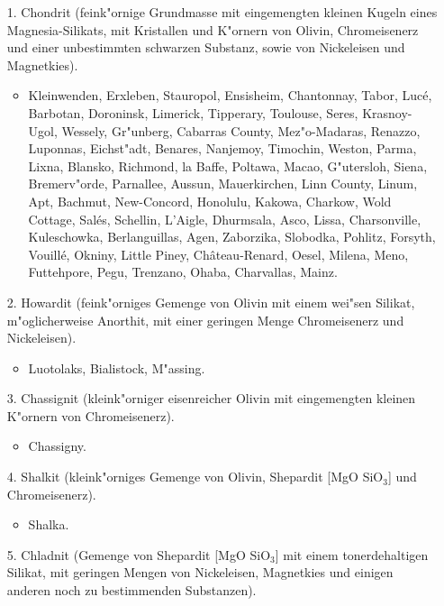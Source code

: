 \documentclass[a4paper, 11pt, oneside]{article}
\begin{document}
\begin{itemize}
    \item[1.] Chondrit (feink"ornige Grundmasse mit eingemengten kleinen Kugeln eines Magnesia-Silikats, mit Kristallen und K"ornern von Olivin, Chromeisenerz und einer unbestimmten schwarzen Substanz, sowie von Nickeleisen und Magnetkies).
    \begin{itemize}
        \item Kleinwenden, Erxleben, Stauropol, Ensisheim, Chantonnay, Tabor, Lucé, Barbotan, Doroninsk, Limerick, Tipperary, Toulouse, Seres, Krasnoy-Ugol, Wessely, Gr"unberg, Cabarras County, Mez"o-Madaras, Renazzo, Luponnas, Eichst"adt, Benares, Nanjemoy, Timochin, Weston, Parma, Lixna, Blansko, Richmond, la Baffe, Poltawa, Macao, G"utersloh, Siena, Bremerv"orde, Parnallee, Aussun, Mauerkirchen, Linn County, Linum, Apt, Bachmut, New-Concord, Honolulu, Kakowa, Charkow, Wold Cottage, Salés, Schellin, L'Aigle, Dhurmsala, Asco, Lissa, Charsonville, Kuleschowka, Berlanguillas, Agen, Zaborzika, Slobodka, Pohlitz, Forsyth, Vouillé, Okniny, Little Piney, Château-Renard, Oesel, Milena, Meno, Futtehpore, Pegu, Trenzano, Ohaba, Charvallas, Mainz.
    \end{itemize}
    \item[2.] Howardit (feink"orniges Gemenge von Olivin mit einem wei"sen Silikat, m"oglicherweise Anorthit, mit einer geringen Menge Chromeisenerz und Nickeleisen).
    \begin{itemize}
        \item Luotolaks, Bialistock, M"assing.
    \end{itemize}
    \item[3.] Chassignit (kleink"orniger eisenreicher Olivin mit eingemengten kleinen K"ornern von Chromeisenerz).
    \begin{itemize}
        \item Chassigny.
    \end{itemize}
    \item[4.] Shalkit (kleink"orniges Gemenge von Olivin, Shepardit [MgO SiO$_{3}$] und Chromeisenerz).
    \begin{itemize}
        \item Shalka.
    \end{itemize}
    \item[5.] Chladnit (Gemenge von Shepardit [MgO SiO$_{3}$] mit einem tonerdehaltigen Silikat, mit geringen Mengen von Nickeleisen, Magnetkies und einigen anderen noch zu bestimmenden Substanzen).
    \begin{itemize}

\end{itemize}
\end{itemize}
\end{document}
